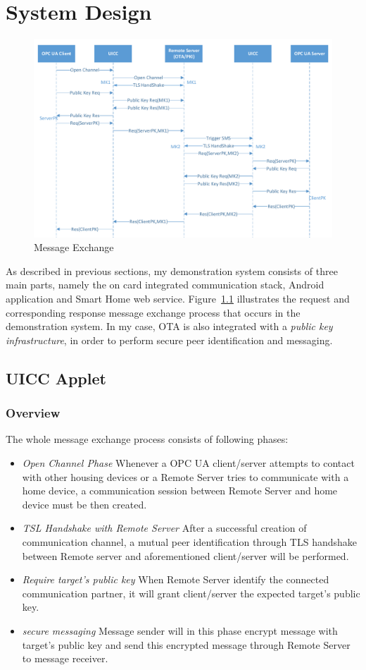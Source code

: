 \chapter{System Design}

\begin{figure}[!htbp]
	\centering
	\includegraphics[width=1\textwidth]{whole-structure}
		\caption{Message Exchange}
	\label{fig:whole-structure}
\end{figure}

As described in previous sections, my demonstration system consists of three main parts, namely the on card integrated communication stack, Android application and Smart Home web service. Figure~\ref{fig:whole-structure} illustrates the request and corresponding response message exchange process that occurs in the demonstration system. In my case, OTA is also integrated with a \emph{public key infrastructure},  in order to perform secure peer identification and messaging.


\section{UICC Applet}
\subsection{Overview}
The whole message exchange process consists of following phases:
\begin{itemize}
\item \emph{Open Channel Phase} Whenever a OPC UA client/server attempts to contact with other housing devices or a Remote Server tries to communicate with a home device, a communication session between Remote Server and home device must be then created.
\item \emph{TSL Handshake with Remote Server} After a successful creation of communication channel, a mutual peer identification through TLS handshake between Remote server and aforementioned client/server will be performed.
\item \emph{Require target's public key} When Remote Server identify the connected communication partner, it will grant client/server the expected target's public key. 
\item \emph{secure messaging} Message sender will in this phase encrypt message with target's public key and send this encrypted message through Remote Server to message receiver. 
\end{itemize}
